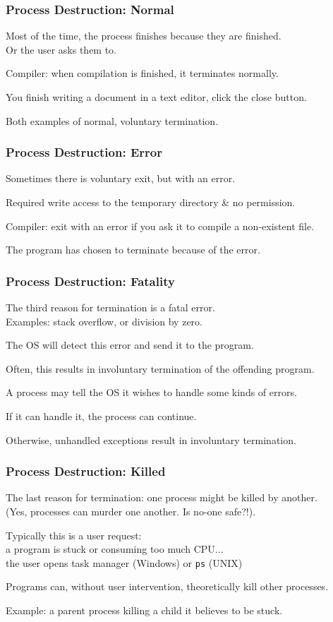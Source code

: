 \begin{frame}
	\frametitle{Process Destruction: Normal}

	Most of the time, the process finishes because they are finished.\\
	\quad Or the user asks them to.

	Compiler: when compilation is finished, it terminates normally.

	You finish writing a document in a text editor, click the close button.

	Both examples of normal, voluntary termination.

\end{frame}

\begin{frame}
	\frametitle{Process Destruction: Error}

	Sometimes there is voluntary exit, but with an error.

	Required write access to the temporary directory \& no permission.

	Compiler: exit with an error if you ask it to compile a non-existent file.

	The program has chosen to terminate because of the error.

\end{frame}

\begin{frame}
	\frametitle{Process Destruction: Fatality}

	The third reason for termination is a fatal error.\\
	\quad Examples: stack overflow, or division by zero.

	The OS will detect this error and send it to the program.

	Often, this results in involuntary termination of the offending program.

	A process may tell the OS it wishes to handle some kinds of errors.

	If it can handle it, the process can continue.

	Otherwise, unhandled exceptions result in involuntary termination.

\end{frame}

\begin{frame}
	\frametitle{Process Destruction: Killed}

	The last reason for termination: one process might be killed by another.\\
	\quad (Yes, processes can murder one another. Is no-one safe?!).

	Typically this is a user request:\\
	\quad a program is stuck or consuming too much CPU...\\
	\quad the user opens task manager (Windows) or \texttt{ps} (UNIX)

	Programs can, without user intervention, theoretically kill other processes.

	Example: a parent process killing a child it believes to be stuck.

\end{frame}

